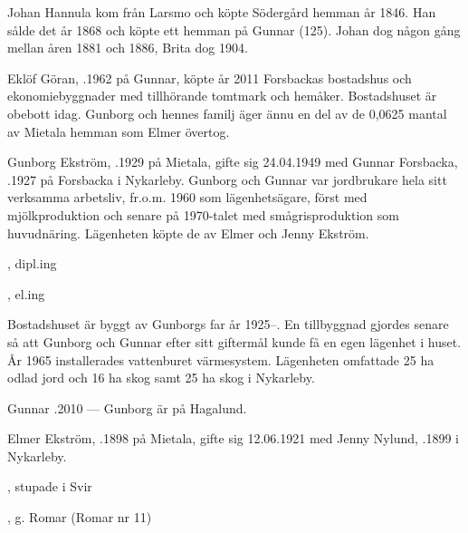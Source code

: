 Johan Hannula kom från Larsmo och köpte Södergård hemman år 1846. Han sålde det år 1868 och köpte ett hemman på Gunnar (125). Johan dog någon gång mellan åren 1881 och 1886, Brita dog 1904.






Eklöf Göran, .1962 på Gunnar, köpte år 2011 Forsbackas bostadshus och ekonomiebyggnader med tillhörande tomtmark och hemåker. Bostadshuset är obebott idag. Gunborg och hennes familj äger ännu en del av de 0,0625 mantal av Mietala hemman som Elmer övertog.


Gunborg Ekström, .1929 på Mietala, gifte sig 24.04.1949 med Gunnar Forsbacka, .1927 på Forsbacka i Nykarleby. Gunborg och Gunnar var jordbrukare hela sitt verksamma arbetsliv, fr.o.m. 1960 som lägenhetsägare, först med mjölkproduktion och senare på 1970-talet med smågrisproduktion som huvudnäring. Lägenheten köpte de av Elmer och Jenny Ekström.
\begin{jhchildren}
  \item {}, dipl.ing
  \item {}, el.ing
\end{jhchildren}

Bostadshuset är byggt av Gunborgs far år 1925--. En tillbyggnad gjordes senare så att Gunborg och Gunnar efter sitt
giftermål kunde få en egen lägenhet i huset. År 1965 installerades vattenburet värmesystem. Lägenheten omfattade 25 ha odlad jord och 16 ha skog samt 25 ha skog i Nykarleby.

Gunnar .2010  ---  Gunborg är på Hagalund.


Elmer Ekström, .1898 på Mietala, gifte sig 12.06.1921 med Jenny Nylund, .1899 i Nykarleby.
\begin{jhchildren}
  \item {}, stupade i Svir
  \item {}
  \item {}, g. Romar (Romar nr 11)
\end{jhchildren}

